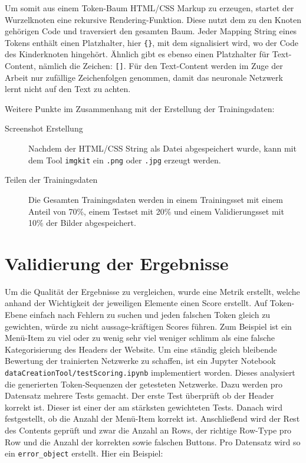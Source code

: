 \documentclass[pdftex,a4paper,halfparskip, article]{scrartcl}
\begin{document}
Um somit aus einem Token-Baum HTML/CSS Markup zu erzeugen, startet der Wurzelknoten eine rekursive Rendering-Funktion. Diese nutzt dem zu den Knoten gehörigen Code und traversiert den gesamten Baum. Jeder Mapping String eines Tokens enthält einen Platzhalter, hier \texttt{\{\}}, mit dem signalisiert wird, wo der Code des Kinderknoten hingehört. Ähnlich gibt es ebenso einen Platzhalter für Text-Content, nämlich die Zeichen: \texttt{[]}. 
Für den Text-Content werden im Zuge der Arbeit nur zufällige Zeichenfolgen genommen, damit das neuronale Netzwerk lernt nicht auf den Text zu achten. 

Weitere Punkte im Zusammenhang mit der Erstellung der Trainingsdaten:

\begin{description}
	\item[Screenshot Erstellung] Nachdem der HTML/CSS String als Datei abgespeichert wurde, kann mit dem Tool \texttt{imgkit} ein \texttt{.png} oder \texttt{.jpg} erzeugt werden.
	\item[Teilen der Trainingsdaten] Die Gesamten Trainingsdaten werden in einem Trainingsset mit einem Anteil von 70\%, einem Testset mit 20\% und einem Validierungsset mit 10\% der Bilder abgespeichert.
\end{description}




\newpage
\section{Validierung der Ergebnisse}

Um die Qualität der Ergebnisse zu vergleichen, wurde eine Metrik erstellt, welche anhand der Wichtigkeit der jeweiligen Elemente einen Score erstellt. Auf Token-Ebene einfach nach Fehlern zu suchen und jeden falschen Token gleich zu gewichten, würde zu nicht aussage-kräftigen Scores führen. Zum Beispiel ist ein Menü-Item zu viel oder zu wenig sehr viel weniger schlimm als eine falsche Kategorisierung des Headers der Website. Um eine ständig gleich bleibende Bewertung der trainierten Netzwerke zu schaffen, ist ein Jupyter Notebook \texttt{dataCreationTool/testScoring.ipynb} implementiert worden. Dieses analysiert die generierten Token-Sequenzen der getesteten Netzwerke. Dazu werden pro Datensatz mehrere Tests gemacht. Der erste Test überprüft ob der Header korrekt ist. Dieser ist einer der am stärksten gewichteten Tests. Danach wird festgestellt, ob die Anzahl der Menü-Item korrekt ist. Anschließend wird der Rest des Contents geprüft und zwar die Anzahl an Rows, der richtige Row-Type pro Row und die Anzahl der korrekten sowie falschen Buttons. Pro Datensatz wird so ein \texttt{error\_object} erstellt. 
Hier ein Beispiel:
\end{document}
